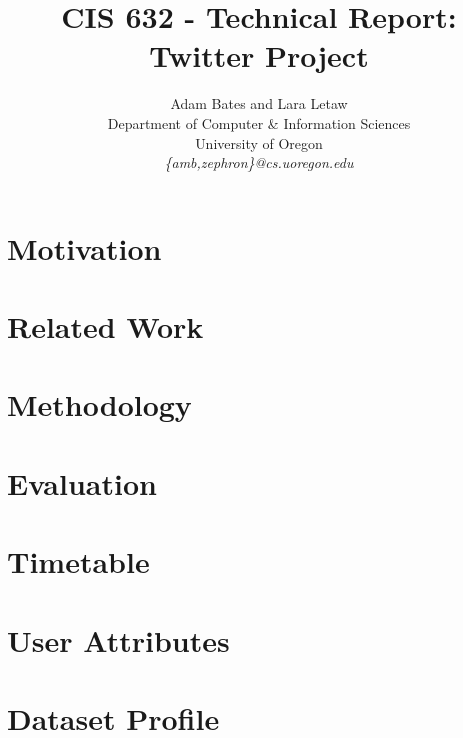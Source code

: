 \documentclass[10pt,twocolumn]{IEEEtran11}
\begin{document}


\title{\Large \bf CIS 632 - Technical Report: Twitter Project
}

\author{Adam Bates and Lara Letaw\\
Department of Computer \& Information Sciences\\
University of Oregon\\
\textit{\{amb,zephron\}@cs.uoregon.edu}}

\maketitle


%

\section{Motivation}  


\section{Related Work}  


\section{Methodology}


\section{Evaluation}


\section{Timetable}


\onecolumn
\section{User Attributes}


\twocolumn
\section{Dataset Profile}



\end{document}
